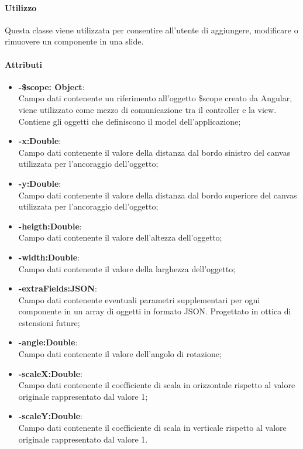 	\paragraph{Utilizzo}
	Questa classe viene utilizzata per consentire all'utente di aggiungere, modificare o rimuovere un componente in una slide.
	
	\paragraph{Attributi}
	\begin{itemize}
		\item \textbf{-\$scope: Object}:\\
			Campo dati contenente un riferimento all'oggetto \$scope creato da Angular, viene utilizzato come mezzo di comunicazione tra il controller e la view. Contiene gli oggetti che definiscono il model dell'applicazione;
		\item\textbf{-x:Double}:\\
			Campo dati contenente il valore della distanza dal bordo sinistro del canvas utilizzata per l'ancoraggio dell'oggetto;
		\item\textbf{-y:Double}:\\
			Campo dati contenente il valore della distanza dal bordo superiore del canvas utilizzata per l'ancoraggio dell'oggetto;
		\item\textbf{-heigth:Double}:\\
			Campo dati contenente il valore dell'altezza dell'oggetto;
		\item\textbf{-width:Double}:\\
			Campo dati contenente il valore della larghezza dell'oggetto;
		\item\textbf{-extraFields:JSON}:\\
			Campo dati contenente eventuali parametri supplementari per ogni componente in un array di oggetti in formato JSON. Progettato in ottica di estensioni future; 
		\item\textbf{-angle:Double}:\\	
			Campo dati contenente il valore dell'angolo di rotazione;
		\item\textbf{-scaleX:Double}:\\
			Campo dati contenente il coefficiente di scala in orizzontale rispetto al valore originale rappresentato dal valore 1;
		\item\textbf{-scaleY:Double}:\\	
			Campo dati contenente il coefficiente di scala in verticale rispetto al valore originale rappresentato dal valore 1.
	
	\end{itemize}
	
